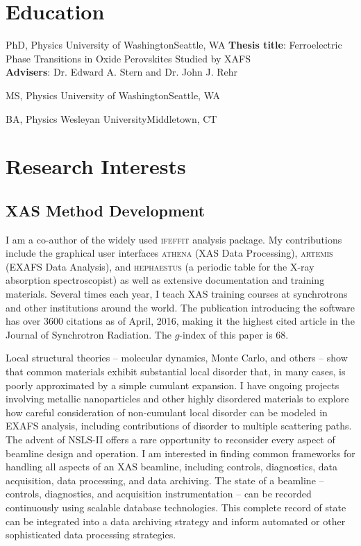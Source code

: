 \documentclass[11pt]{moderncv}
\begin{document}
\section{Education}
        {PhD, Physics}
        {University of Washington}{Seattle, WA}{}
        {\textbf{Thesis title}: Ferroelectric Phase Transitions in Oxide
          Perovskites Studied by XAFS\\
          \textbf{Advisers}: Dr. Edward A. Stern and Dr. John J. Rehr}  %

        {MS, Physics}
        {University of Washington}{Seattle, WA}{}{}

        {BA, Physics}
        {Wesleyan University}{Middletown, CT}{}{}


\section{Research Interests}

\subsection{XAS Method Development}
%
{I am a co-author of the widely used \textsc{ifeffit} analysis
  package.  My contributions include the graphical user interfaces
  \textsc{athena} (XAS Data Processing), \textsc{artemis} (EXAFS Data
  Analysis), and \textsc{hephaestus} (a periodic table for the X-ray
  absorption spectroscopist) as well as extensive documentation and
  training materials.  Several times each year, I teach XAS training
  courses at synchrotrons and other institutions around the
  world. \newline{} The publication introducing the software has over
  3600 citations as of April, 2016, making it the highest cited
  article in the Journal of Synchrotron Radiation.  The $g$-index of
  this paper is 68.}

%
{Local structural theories -- molecular dynamics, Monte Carlo,
  and others -- show that common materials exhibit substantial local
  disorder that, in many cases, is poorly approximated by a simple
  cumulant expansion.  I have ongoing projects involving metallic
  nanoparticles and other highly disordered materials to explore how
  careful consideration of non-cumulant local disorder can be modeled
  in EXAFS analysis, including contributions of disorder to multiple
  scattering paths.}
%
%
{The advent of NSLS-II offers a rare opportunity to reconsider every
  aspect of beamline design and operation.  I am interested in finding
  common frameworks for handling all aspects of an XAS beamline,
  including controls, diagnostics, data acquisition, data processing,
  and data archiving.  The state of a beamline -- controls,
  diagnostics, and acquisition instrumentation -- can be recorded
  continuously using scalable database technologies.  This complete
  record of state can be integrated into a data archiving strategy and
  inform automated or other sophisticated data processing strategies.}
\end{document}
